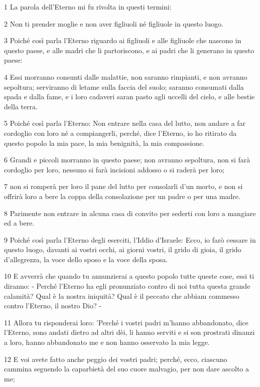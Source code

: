 \par 1 La parola dell'Eterno mi fu rivolta in questi termini:
\par 2 Non ti prender moglie e non aver figliuoli né figliuole in questo luogo.
\par 3 Poiché così parla l'Eterno riguardo ai figliuoli e alle figliuole che nascono in questo paese, e alle madri che li partoriscono, e ai padri che li generano in questo paese:
\par 4 Essi morranno consunti dalle malattie, non saranno rimpianti, e non avranno sepoltura; serviranno di letame sulla faccia del suolo; saranno consumati dalla spada e dalla fame, e i loro cadaveri saran pasto agli uccelli del cielo, e alle bestie della terra.
\par 5 Poiché così parla l'Eterno: Non entrare nella casa del lutto, non andare a far cordoglio con loro né a compiangerli, perché, dice l'Eterno, io ho ritirato da questo popolo la mia pace, la mia benignità, la mia compassione.
\par 6 Grandi e piccoli morranno in questo paese; non avranno sepoltura, non si farà cordoglio per loro, nessuno si farà incisioni addosso o si raderà per loro;
\par 7 non si romperà per loro il pane del lutto per consolarli d'un morto, e non si offrirà loro a bere la coppa della consolazione per un padre o per una madre.
\par 8 Parimente non entrare in alcuna casa di convito per sederti con loro a mangiare ed a bere.
\par 9 Poiché così parla l'Eterno degli eserciti, l'Iddio d'Israele: Ecco, io farò cessare in questo luogo, davanti ai vostri occhi, ai giorni vostri, il grido di gioia, il grido d'allegrezza, la voce dello sposo e la voce della sposa.
\par 10 E avverrà che quando tu annunzierai a questo popolo tutte queste cose, essi ti diranno: - Perché l'Eterno ha egli pronunziato contro di noi tutta questa grande calamità? Qual è la nostra iniquità? Qual è il peccato che abbiam commesso contro l'Eterno, il nostro Dio? -
\par 11 Allora tu risponderai loro: 'Perché i vostri padri m'hanno abbandonato, dice l'Eterno, sono andati dietro ad altri dèi, li hanno serviti e si son prostrati dinanzi a loro, hanno abbandonato me e non hanno osservato la mia legge.
\par 12 E voi avete fatto anche peggio dei vostri padri; perché, ecco, ciascuno cammina seguendo la caparbietà del suo cuore malvagio, per non dare ascolto a me;

